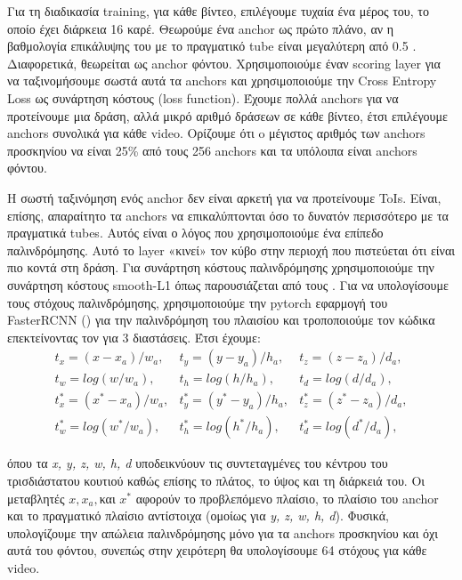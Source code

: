 Για τη διαδικασία \en training\gr, για κάθε βίντεο, επιλέγουμε τυχαία ένα μέρος του, το οποίο έχει διάρκεια 16 καρέ. Θεωρούμε ένα \en anchor \gr ως πρώτο πλάνο,
αν η βαθμολογία επικάλυψης του με το πραγματικό
\en tube \gr είναι μεγαλύτερη από 0.5 . Διαφορετικά, θεωρείται ως \en anchor  \gr φόντου. Χρησιμοποιούμε έναν \en scoring layer \gr για να ταξινομήσουμε σωστά αυτά τα \en anchors \gr και χρησιμοποιούμε
την \en Cross Entropy Loss \gr ως συνάρτηση κόστους \en (loss function\gr). Έχουμε πολλά \en anchors \gr για να προτείνουμε μια δράση, αλλά μικρό αριθμό δράσεων σε κάθε βίντεο, έτσι επιλέγουμε  anchors \gr συνολικά για κάθε \en video\gr. Ορίζουμε ότι o μέγιστος αριθμός των \en anchors \gr προσκηνίου να είναι 25\% από τους 256 \en anchors \gr και τα υπόλοιπα είναι \en anchors \gr φόντου.  \par
Η σωστή ταξινόμηση ενός \en anchor \gr δεν είναι αρκετή για να προτείνουμε \en ToIs\gr. Είναι, επίσης,  απαραίτητο τα \en anchors \gr να επικαλύπτονται όσο το δυνατόν περισσότερο με τα πραγματικά \en
tubes\gr.
Αυτός είναι ο λόγος που χρησιμοποιούμε ένα επίπεδο παλινδρόμησης. Αυτό το \en layer \gr «κινεί» τον κύβο στην περιοχή που πιστεύεται ότι είναι πιο κοντά στη δράση.
Για συνάρτηση κόστους παλινδρόμησης χρησιμοποιούμε την συνάρτηση κόστους \en smooth-L1 \gr  όπως παρουσιάζεται από τους \en \cite{DBLP:journals/corr/GirshickDDM13}\gr. Για να υπολογίσουμε τους
 στόχους παλινδρόμησης, χρησιμοποιούμε την \en pytorch \gr εφαρμογή του  \en FasterRCNN (\cite{jjfaster2rcnn}\gr) για την παλινδρόμηση του πλαισίου και 
τροποποιούμε τον κώδικα επεκτείνοντας τον για 3 διαστάσεις. %
Έτσι έχουμε:
\en
\[ \begin{matrix}
    t_x = (x-x_a)/w_a, & t_y = (y-y_a)/h_a, & t_z= (z-z_a)/d_a, \\
    t_w= log(w/w_a), & t_h= log(h/h_a), & t_d = log(d/d_a), \\
    t^*_x = (x^* - x_a)/w_a, & t^*_y = (y^* - y_a)/h_a, & t^*_z = (z^* - z_a)/d_a, \\
    t^*_w = log(w^* /w_a), & t^*_h = log(h^*/h_a), & t^*_d = log(d^*/d_a),
  \end{matrix}
\] \gr

όπου τα \en\textit{x, y, z, w, h, d} \gr υποδεικνύουν τις συντεταγμένες του κέντρου του τρισδιάστατου κουτιού καθώς επίσης το πλάτος, το ύψος και τη διάρκειά του. Οι μεταβλητές
\en $x, x_a, $\gr και \en $ x^*$ \gr αφορούν το προβλεπόμενο πλαίσιο, το πλαίσιο του \en anchor \gr και το πραγματικό πλαίσιο αντίστοιχα (ομοίως για \en \textit{y, z, w, h, d}\gr).
Φυσικά, υπολογίζουμε την απώλεια παλινδρόμησης μόνο για τα \en anchors \gr προσκηνίου και όχι αυτά του φόντου, συνεπώς στην χειρότερη θα υπολογίσουμε 64 στόχους για κάθε \en video.\gr \par

